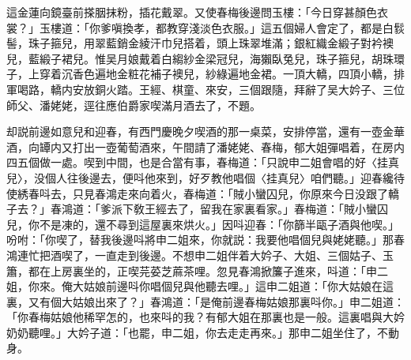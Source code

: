 這金蓮向鏡臺前搽胭抹粉，插花戴翠。又使春梅後邊問玉樓：「今日穿甚顏色衣裳？」玉樓道：「你爹嗔換孝，都教穿淺淡色衣服。」這五個婦人會定了，都是白䯼髻，珠子箍兒，用翠藍銷金綾汗巾兒搭着，頭上珠翠堆滿；銀紅織金緞子對衿襖兒，藍緞子裙兒。惟吴月娘戴着白縐紗金梁冠兒，海獺臥兔兒，珠子箍兒，胡珠環子，上穿着沉香色遍地金粧花補子襖兒，紗綠遍地金裙。一頂大轎，四頂小轎，排軍喝路，轎内安放銅火踏。王經、棋童、來安，三個跟隨，拜辭了吴大妗子、三位師父、潘姥姥，逕往應伯爵家喫滿月酒去了，不題。

却説前邊如意兒和迎春，有西門慶晚夕喫酒的那一桌菜，安排停當，還有一壺金華酒，向罈内又打出一壺葡萄酒來，午間請了潘姥姥、春梅，郁大姐彈唱着，在房内四五個做一處。喫到中間，也是合當有事，春梅道：「只說申二姐會唱的好〈挂真兒〉，没個人往後邊去，便呌他來到，好歹教他唱個〈挂真兒〉咱們聽。」迎春纔待使綉春呌去，只見春鴻走來向着火，春梅道：「賊小蠻囚兒，你原來今日没跟了轎子去？」春鴻道：「爹派下敎王經去了，留我在家裏看家。」春梅道：「賊小蠻囚兒，你不是凍的，還不尋到這屋裏來烘火。」因呌迎春：「你篩半甌子酒與他喫。」吩咐：「你喫了，替我後邊呌將申二姐來，你就説：我要他唱個兒與姥姥聽。」那春鴻連忙把酒喫了，一直走到後邊。不想申二姐伴着大妗子、大姐、三個姑子、玉簫，都在上房裏坐的，正喫芫荽芝蔴茶哩。忽見春鴻掀簾子進來，呌道：「申二姐，你來。俺大姑娘前邊呌你唱個兒與他聽去哩。」這申二姐道：「你大姑娘在這裏，又有個大姑娘出來了？」春鴻道：「是俺前邊春梅姑娘那裏呌你。」申二姐道：「你春梅姑娘他稀罕怎的，也來呌的我？有郁大姐在那裏也是一般。這裏唱與大妗奶奶聽哩。」大妗子道：「也罷，申二姐，你去走走再來。」那申二姐坐住了，不動身。

